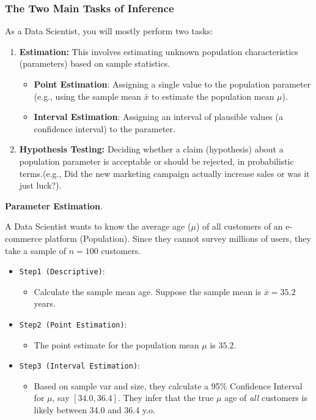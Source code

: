 \subsubsection{The Two Main Tasks of Inference}
As a Data Scientist, you will mostly perform two tasks:
\begin{enumerate}
\item \textbf{Estimation:}  This involves estimating unknown population characteristics (parameters) based on sample statistics.
 \begin{itemize}
  \item \textbf{Point Estimation}: Assigning a single value to the population parameter (e.g., using the sample mean $\bar{x}$ to estimate the population mean $\mu$).
  \item \textbf{Interval Estimation}: Assigning an interval of plausible values (a confidence interval) to the parameter.
  \end{itemize}
    \item \textbf{Hypothesis Testing:} Deciding whether a claim (hypothesis) about a population parameter is acceptable or should be rejected, in probabilistic terms.(e.g., Did the new marketing campaign actually increase sales or was it just luck?).
\end{enumerate}

\vspace{0.2cm}
\begin{example}{\textbf{Parameter Estimation}}.

A Data Scientist wants to know the average age ($\mu$) of all customers of an e-commerce platform (Population). Since they cannot survey millions of users, they take a sample of $n=100$ customers.
\begin{itemize}
 \item \texttt{Step1 (Descriptive)}:
 \begin{itemize}
     \item Calculate the sample mean age. Suppose the sample mean is $\bar{x} = 35.2$ years.
 \end{itemize}
 \item \texttt{Step2 (Point Estimation)}:
 \begin{itemize}
     \item The point estimate for the population mean $\mu$ is $35.2$.
 \end{itemize}
 \item \texttt{Step3 (Interval Estimation)}:
 \begin{itemize}
     \item Based on sample var and size, they calculate a 95\% Confidence Interval for $\mu$, say $[34.0, 36.4]$. They infer that the true $\mu$ age of \textit{all} customers is likely between 34.0 and 36.4 y.o.
 \end{itemize} 
\end{itemize}
\end{example}

